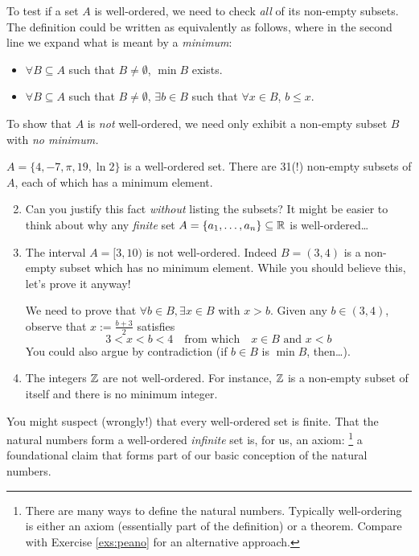 To test if a set $A$ is well-ordered, we need to check \emph{all} of its non-empty subsets. The definition could be written as equivalently as follows, where in the second line we expand what is meant by a \emph{minimum}:
\begin{itemize}
  \item $\forall B\subseteq A$ such that $B\neq\emptyset$, $\min B$ exists.
  \item $\forall B\subseteq A$ such that $B\neq\emptyset$, $\exists b\in B$ such that $\forall x\in B$, $b\le x$.
\end{itemize}
To show that $A$ is \emph{not} well-ordered, we need only exhibit a non-empty subset $B$ with \emph{no minimum.}

\begin{examples}{}{}
	\exstart $A=\{4,-7,\pi,19,\ln 2\}$ is a well-ordered set. There are 31(!) non-empty subsets of $A$, each of which has a minimum element.\vspace{-5pt}
	\begin{enumerate}\setcounter{enumi}{1}
	  \item[] Can you justify this fact \emph{without} listing the subsets? It might be easier to think about why any \emph{finite} set $A=\{a_1,\ldots,a_n\}\subseteq\mathbb{R}$ is well-ordered\ldots 
	  
	  \item The interval $A=[3,10)$ is not well-ordered. Indeed $B=(3,4)$ is a non-empty subset which has no minimum element. While you should believe this, let's prove it anyway!\par
	  We need to prove that $\forall b\in B, \exists x\in B$ with $x>b$. Given any $b\in(3,4)$, observe that $x:=\frac{b+3}2$ satisfies
	  \[
	  	3<x<b<4 \quad\text{from which}\quad x\in B\text{ and }x<b
	  \]
	  You could also argue by contradiction (if $b\in B$ is $\min B$, then\ldots).
	  
	  \item The integers $\mathbb{Z}$ are not well-ordered. For instance, $\mathbb{Z}$ is a non-empty subset of itself and there is no minimum integer.
	\end{enumerate}
\end{examples}

You might suspect (wrongly!) that every well-ordered set is finite. That the natural numbers form a well-ordered \emph{infinite} set is, for us, an axiom:
\footnote{There are many ways to define the natural numbers. Typically well-ordering is either an axiom (essentially part of the definition) or a theorem. Compare with Exercise \ref{exs:peano} for an alternative approach.} a foundational claim that forms part of our basic conception of the natural numbers.

